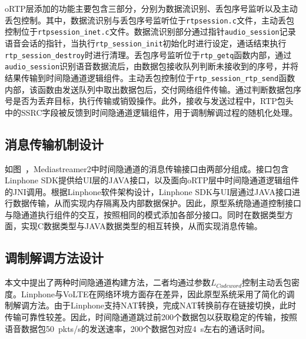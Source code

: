 oRTP层添加的功能主要包含三部分，分别为数据流识别、丢包序号监听以及主动丢包控制。其中，数据流识别与丢包序号监听位于\texttt{rtpsession.c}文件，主动丢包控制位于\texttt{rtpsession\_inet.c}文件。数据流识别部分通过指针\texttt{audio\_session}记录语音会话的指针，当执行\texttt{rtp\_session\_init}初始化时进行设定，通话结束执行\texttt{rtp\_session\_destroy}时进行清理。丢包序号监听位于\texttt{rtp\_getq}函数内部，通过\texttt{audio\_session}识别语音数据流后，由数据包接收队列判断未接收到的序号，并将结果传输到时间隐通道逻辑组件。主动丢包控制位于\texttt{rtp\_session\_rtp\_send}函数内部，该函数由发送队列中取出数据包后，交付网络组件传输。通过判断数据包序号是否为丢弃目标，执行传输或销毁操作。此外，接收与发送过程中，RTP包头中的SSRC字段被反馈到时间隐通道逻辑组件，用于调制解调过程的随机化处理。

\subsection{消息传输机制设计}
\label{chap:linphone:designation:data}


如图\ ，Mediastreamer2中时间隐通道的消息传输接口由两部分组成。接口包含Linphone SDK提供给UI层的JAVA接口，以及面向oRTP层中时间隐通道逻辑组件的JNI调用。根据Linphone软件架构设计，Linphone SDK与UI层通过JAVA接口进行数据传输，从而实现内存隔离及内部数据保护。因此，原型系统隐通道控制接口与隐通道执行组件的交互，按照相同的模式添加各部分接口。同时在数据类型方面，实现C数据类型与JAVA数据类型的相互转换，从而实现消息传输。

\subsection{调制解调方法设计}
\label{chap:linphone:designation:modulation}

本文中提出了两种时间隐通道构建方法，二者均通过参数$L_{Codeword}$控制主动丢包密度。Linphone与VoLTE在网络环境方面存在差异，因此原型系统采用了简化的调制解调方法。由于Linphone支持NAT转换，完成NAT转换前存在链接切换，此时传输可靠性较差。因此，时间隐通道跳过前200个数据包以获取稳定的传输，按照语音数据包{50\ pkts/s}的发送速率，200个数据包对应{4\ s}左右的通话时间。

